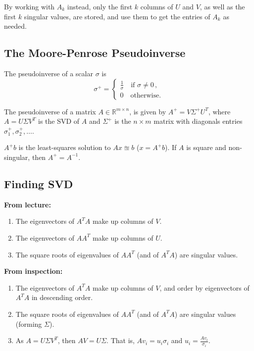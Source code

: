 \documentclass[9pt]{article}
\begin{document}
\begin{multicols}{3}
By working with $A_k$ instead, only the first $k$ columns of $U$ and $V$, as well as the first $k$ singular values,  are stored, and use them to get the entries of $A_k$ as needed.

\hdashrule{\linewidth}{0.5pt}{1mm 1mm}
\subsection*{The Moore-Penrose Pseudoinverse}
The pseudoinverse of a scalar $\sigma$ is 
\[
\sigma^+ = \begin{cases}
    \frac{1}{\sigma} \quad \text{if }\sigma \neq 0\, , \\
    0 \quad \text{otherwise.}
\end{cases}
\]

The pseudoinverse of a matrix $A \in \mathbb{R}^{m \times n}$, is given by $A^+ = V \Sigma^+ U^T$,
where $A = U \Sigma V^T$ is the SVD of $A$ and $\Sigma^+$ is the $n \times m$ matrix with diagonals entries $\sigma_1^+, \sigma_2^+, \ldots$.

$A^+b$ is the least-squares solution to $Ax \approxeq b$ ($x = A^+b$). If $A$ is square and non-singular, then $A^+ = A^{-1}$.


\subsection*{Finding SVD}
\textbf{From lecture:}
\begin{enumerate}
    \item The eigenvectors of $A^TA$ make up columns of $V$.
    \item The eigenvectors of $AA^T$ make up columns of $U$.
    \item The square roots of eigenvalues of $AA^T$ (and of $A^T A$) are singular values.
\end{enumerate}

\columnbreak

\textbf{From inspection:}
\begin{enumerate}
    \item The eigenvectors of $A^TA$ make up columns of $V$, and order by eigenvectors of $A^TA$ in descending order.
    \item The square roots of eigenvalues of $AA^T$ (and of $A^T A$) are singular values (forming $\Sigma$).
    \item As $A = U \Sigma V^T$, then $AV = U\Sigma$. That is, $Av_i = u_i\sigma_i$ and $u_i = \frac{Av_i}{\sigma_i}$.
\end{enumerate}


\end{multicols}
\end{document}
